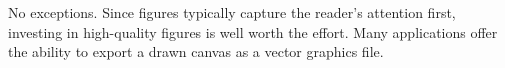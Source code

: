 


\noindent No exceptions.
Since figures typically capture the reader's attention first, investing in high-quality figures is well worth the effort.
Many applications offer the ability to export a drawn canvas as a vector graphics file.

